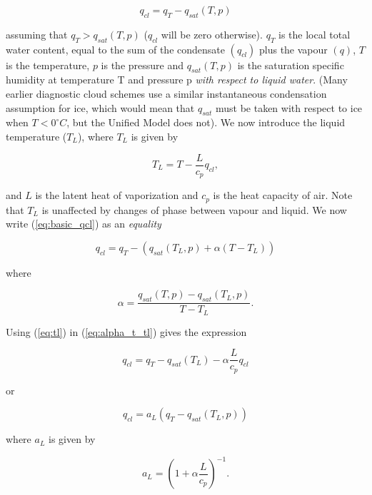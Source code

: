 \documentclass{UMDP_article}
\begin{document}
\begin{equation}
q_{cl} = q_T - q_{sat}(T,p)
\label{eq:basic_qcl}
\end{equation}

assuming that $q_T > q_{sat}(T,p)$ ($q_{cl}$ will be zero otherwise).
$q_T$ is the local total water
content, equal to the sum of the condensate $(q_{cl})$ plus the vapour
$(q)$, $T$ is the temperature, $p$ is the pressure and $q_{sat}(T,p)$
is the saturation specific humidity at temperature T and pressure
p \textit{with respect to liquid water}. (Many earlier diagnostic
cloud schemes use a similar instantaneous condensation assumption
for ice, which would mean that $q_{sat}$ must be taken with respect
to ice when $T < 0 ^{\circ} C$, but the Unified Model does not).
We now introduce the liquid temperature ($T_L$), where $T_L$ is given by

\begin{equation}
T_L = T - \frac{L}{c_p} q_{cl} , 
\label{eq:tl}
\end{equation}

and $L$ is the latent heat of
vaporization and $c_p$ is the heat capacity of air.
Note that $T_L$ is unaffected by changes of phase between vapour and liquid.
We now write (\ref{eq:basic_qcl}) as an \textit{equality}

\begin{equation}
q_{cl} = q_T - \left( q_{sat}(T_L,p) + \alpha (T - T_L) \right)
\label{eq:alpha_t_tl}
\end{equation}

where

\begin{equation}
\alpha = \frac{ q_{sat}(T,p) - q_{sat}(T_L,p) }{T - T_L } .
\label{eq:alpha}
\end{equation}

Using (\ref{eq:tl}) in (\ref{eq:alpha_t_tl}) gives the expression

\begin{equation}
q_{cl} = q_T - q_{sat} (T_L) - \alpha \frac{L}{c_p} q_{cl}
\end{equation}

or

\begin{equation}
q_{cl} = a_L \left( q_T - q_{sat}(T_L,p) \right)
\label{eq:l_eq_al}
\end{equation}

where $a_L$ is given by

\begin{equation}
a_L = \left( 1 + \alpha \frac{L}{c_p} \right) ^{-1} .
\label{eq:a_L}
\end{equation}
\end{document}
